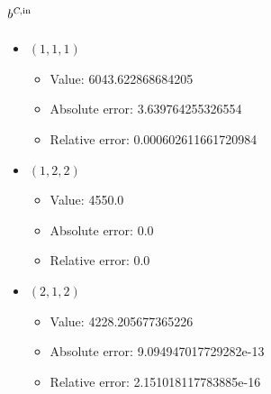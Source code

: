 \documentclass{article}%
\begin{document}
\subsection{$b^{\textsl{C},\text{in}}$}%
\begin{itemize}%
	\item $(1, 1, 1)$%
	\begin{itemize}%
		\item Value: 6043.622868684205%
		\item Absolute error: 3.639764255326554%
		\item Relative error: 0.000602611661720984%
	\end{itemize}%
	\item $(1, 2, 2)$%
	\begin{itemize}%
		\item Value: 4550.0%
		\item Absolute error: 0.0%
		\item Relative error: 0.0%
	\end{itemize}%
	\item $(2, 1, 2)$%
	\begin{itemize}%
		\item Value: 4228.205677365226%
		\item Absolute error: 9.094947017729282e-13%
		\item Relative error: 2.151018117783885e-16%
	\end{itemize}%
\end{itemize}%
\end{document}
